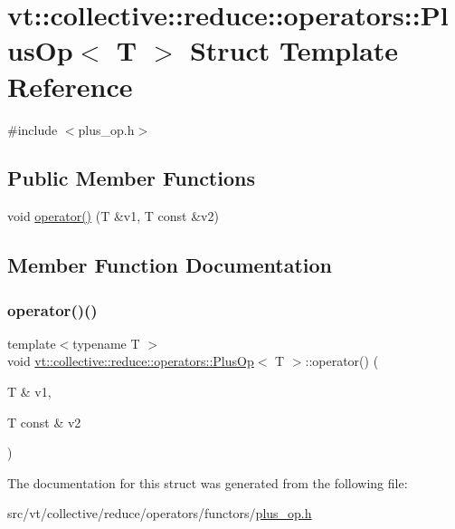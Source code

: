 \hypertarget{structvt_1_1collective_1_1reduce_1_1operators_1_1_plus_op}{}\section{vt\+:\+:collective\+:\+:reduce\+:\+:operators\+:\+:Plus\+Op$<$ T $>$ Struct Template Reference}
\label{structvt_1_1collective_1_1reduce_1_1operators_1_1_plus_op}


{\ttfamily \#include $<$plus\+\_\+op.\+h$>$}

\subsection*{Public Member Functions}
\begin{DoxyCompactItemize}
\item 
void \hyperlink{structvt_1_1collective_1_1reduce_1_1operators_1_1_plus_op_a931975381fcf1a0b29e959eddc1a050b}{operator()} (T \&v1, T const \&v2)
\end{DoxyCompactItemize}


\subsection{Member Function Documentation}
\mbox{\label{structvt_1_1collective_1_1reduce_1_1operators_1_1_plus_op_a931975381fcf1a0b29e959eddc1a050b}} 
\subsubsection{\texorpdfstring{operator()()}{operator()()}}
{\footnotesize\ttfamily template$<$typename T $>$ \\
void \hyperlink{structvt_1_1collective_1_1reduce_1_1operators_1_1_plus_op}{vt\+::collective\+::reduce\+::operators\+::\+Plus\+Op}$<$ T $>$\+::operator() (\begin{DoxyParamCaption}\item[{T \&}]{v1,  }\item[{T const \&}]{v2 }\end{DoxyParamCaption})\hspace{0.3cm}{\ttfamily [inline]}}



The documentation for this struct was generated from the following file\+:\begin{DoxyCompactItemize}
\item 
src/vt/collective/reduce/operators/functors/\hyperlink{plus__op_8h}{plus\+\_\+op.\+h}\end{DoxyCompactItemize}
